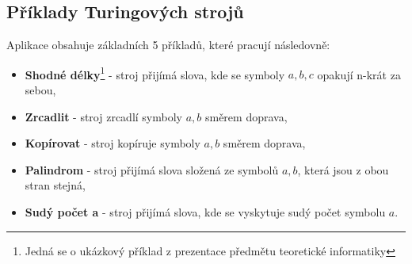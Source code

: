 \subsection{Příklady Turingových strojů}
Aplikace obsahuje základních 5 příkladů, které pracují následovně:
\begin{itemize}
	\item \textbf{Shodné délky}\footnote{Jedná se o ukázkový příklad z prezentace předmětu teoretické informatiky} - stroj přijímá slova, kde se symboly $a, b, c$ opakují n-krát za sebou,
	\item \textbf{Zrcadlit} - stroj zrcadlí symboly $a, b$ směrem doprava,
	\item \textbf{Kopírovat} - stroj kopíruje symboly $a, b$ směrem doprava,
	\item \textbf{Palindrom} - stroj přijímá slova složená ze symbolů $a, b$, která jsou z obou stran stejná,
	\item \textbf{Sudý počet a} - stroj přijímá slova, kde se vyskytuje sudý počet symbolu $a$.
\end{itemize}

